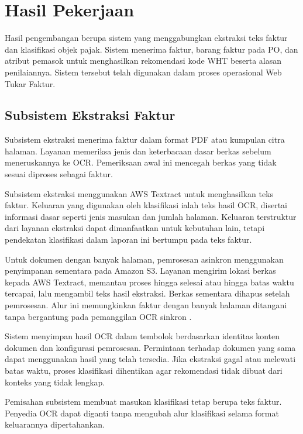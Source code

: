 \section{Hasil Pekerjaan}
\label{sec:hasil_pekerjaan}

Hasil pengembangan berupa sistem yang menggabungkan ekstraksi teks faktur dan klasifikasi objek pajak. Sistem menerima faktur, barang faktur pada PO, dan atribut pemasok untuk menghasilkan rekomendasi kode WHT beserta alasan penilaiannya. Sistem tersebut telah digunakan dalam proses operasional Web Tukar Faktur.

\subsection{Subsistem Ekstraksi Faktur}
\label{subsec:hasil-ekstraksi-faktur}

Subsistem ekstraksi menerima faktur dalam format \label{abbr:PDF}PDF atau kumpulan citra halaman. Layanan memeriksa jenis dan keterbacaan dasar berkas sebelum meneruskannya ke OCR. Pemeriksaan awal ini mencegah berkas yang tidak sesuai diproses sebagai faktur.

Subsistem ekstraksi menggunakan AWS Textract untuk menghasilkan teks faktur. Keluaran yang digunakan oleh klasifikasi ialah teks hasil OCR, disertai informasi dasar seperti jenis masukan dan jumlah halaman. Keluaran terstruktur dari layanan ekstraksi dapat dimanfaatkan untuk kebutuhan lain, tetapi pendekatan klasifikasi dalam laporan ini bertumpu pada teks faktur.

Untuk dokumen dengan banyak halaman, pemrosesan asinkron menggunakan penyimpanan sementara pada Amazon \label{abbr:S3}S3. Layanan mengirim lokasi berkas kepada AWS Textract, memantau proses hingga selesai atau hingga batas waktu tercapai, lalu mengambil teks hasil ekstraksi. Berkas sementara dihapus setelah pemrosesan. Alur ini memungkinkan faktur dengan banyak halaman ditangani tanpa bergantung pada pemanggilan OCR sinkron \parencite{awsTextractAsync}.

Sistem menyimpan hasil OCR dalam tembolok berdasarkan identitas konten dokumen dan konfigurasi pemrosesan. Permintaan terhadap dokumen yang sama dapat menggunakan hasil yang telah tersedia. Jika ekstraksi gagal atau melewati batas waktu, proses klasifikasi dihentikan agar rekomendasi tidak dibuat dari konteks yang tidak lengkap.

Pemisahan subsistem membuat masukan klasifikasi tetap berupa teks faktur. Penyedia OCR dapat diganti tanpa mengubah alur klasifikasi selama format keluarannya dipertahankan.


